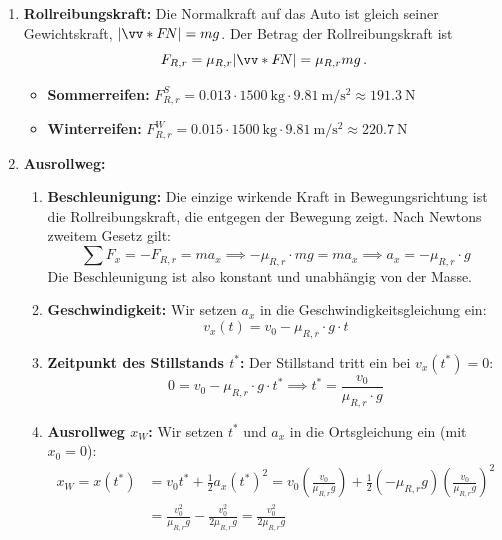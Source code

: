 \documentclass[ngerman]{scrreprt}
\newenvironment{loesungbox}[1]
  {\needspace{5\baselineskip}\begin{loesungboxstyle}[frametitle={#1}]}
  {\end{loesungboxstyle}}
\begin{document}
\begin{loesungbox}{Lösung zu \Cref{aufg:rollreibung}}
\begin{enumerate}
    \item \textbf{Rollreibungskraft:}
    Die Normalkraft auf das Auto ist gleich seiner Gewichtskraft, $|\ivecS{F}{N}| = mg$. Der Betrag der Rollreibungskraft ist 
    $$F_{R,r} = \mu_{R,r} |\ivecS{F}{N}| = \mu_{R,r} m g \mDot$$ 
    \begin{itemize}
        \item \textbf{Sommerreifen:} $F_{R,r}^S = \num{0.013} \cdot \SI{1500}{\kilo\gram} \cdot \SI{9.81}{\meter\per\second\squared} \approx \SI{191.3}{\newton}$ 
        \item \textbf{Winterreifen:} $F_{R,r}^W = \num{0.015} \cdot \SI{1500}{\kilo\gram} \cdot \SI{9.81}{\meter\per\second\squared} \approx \SI{220.7}{\newton}$ 
    \end{itemize}
    
    \item \textbf{Ausrollweg:}
    \begin{enumerate}
        \item \textbf{Beschleunigung:} Die einzige wirkende Kraft in Bewegungsrichtung ist die Rollreibungskraft, die entgegen der Bewegung zeigt. Nach Newtons zweitem Gesetz gilt:
        \begin{equation}\label{eq: a_x_roll}
            \sum F_x = -F_{R,r} = m a_x \implies -\mu_{R,r} \cdot m g = m a_x \implies a_x = -\mu_{R,r}\cdot g 
        \end{equation}
        Die Beschleunigung ist also konstant und unabhängig von der Masse. 
        
        \item \textbf{Geschwindigkeit:} Wir setzen $a_x$ in die Geschwindigkeitsgleichung ein: 
        \begin{equation}
            v_x(t) = v_0 - \mu_{R,r} \cdot g \cdot t
        \end{equation}
        
        \item \textbf{Zeitpunkt des Stillstands $t^*$:} Der Stillstand tritt ein bei $v_x(t^*) = 0$: 
        \begin{equation}\label{eq: t_stern_roll}
            0 = v_0 - \mu_{R,r}\cdot g\cdot t^* \implies t^* = \frac{v_0}{\mu_{R,r} \cdot g} 
        \end{equation}
        
        \item \textbf{Ausrollweg $x_W$:} Wir setzen $t^*$ und $a_x$ in die Ortsgleichung ein (mit $x_0 = 0$): 
        \begin{align}
            x_W = x(t^*) &= v_0 t^* + \frac{1}{2} a_x (t^*)^2 = v_0 \left(\frac{v_0}{\mu_{R,r} g}\right) + \frac{1}{2}(-\mu_{R,r} g)\left(\frac{v_0}{\mu_{R,r} g}\right)^2 \\
            &= \frac{v_0^2}{\mu_{R,r} g} - \frac{v_0^2}{2\mu_{R,r} g} = \frac{v_0^2}{2\mu_{R,r} g} \label{eq: x_w_roll}
        \end{align}
        

\end{enumerate}
\end{enumerate}
\end{loesungbox}
\end{document}
